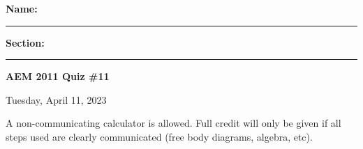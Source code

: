 \documentclass{article}
\begin{document}

\vspace{.5cm}
\noindent
\textbf{Name: }\rule{5cm}{0.4pt}\hspace{.5cm}
\textbf{Section: }\rule{1cm}{0.4pt}
\hfill\textbf{AEM 2011 Quiz \#11}

\noindent
\hfill Tuesday, April 11, 2023
\vspace{1cm}
\noindent

\vspace{.3cm}

\noindent A non-communicating calculator is allowed.  Full credit will only be given if all steps used are clearly communicated (free body diagrams, algebra, etc).

\vspace{0.5cm}











\end{document}
